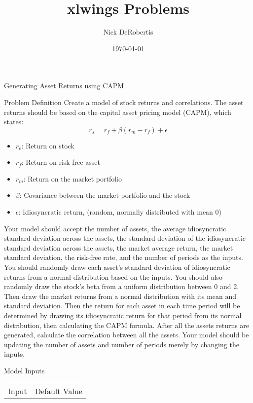 \documentclass[]{article}
\begin{document}
\title{xlwings Problems}
\author{Nick DeRobertis}
\date{\today}
\maketitle
\begin{section}{Generating Asset Returns using CAPM}
\begin{subsection}{Problem Definition}
Create a model of stock returns and correlations. The asset returns should be based on the capital asset pricing model (CAPM), which states:
\begin{equation}
	r_s = r_f + \beta (r_m - r_f) + \epsilon
\end{equation}
\begin{itemize}
\item $r_e$: Return on stock
\item $r_f$: Return on risk free asset
\item $r_m$: Return on the market portfolio
\item $\beta$: Covariance between the market portfolio and the stock
\item $\epsilon$: Idiosyncratic return, (random, normally distributed with mean 0)
\end{itemize}
Your model should accept the number of assets, the average idiosyncratic standard deviation across the assets, the standard deviation of the idiosyncratic standard deviation across the assets, the market average return, the market standard deviation, the risk-free rate, and the number of periods as the inputs. You should randomly draw each asset's standard deviation of idiosyncratic returns from a normal distribution based on the inputs. You should also randomly draw the stock's beta from a uniform distribution between 0 and 2. Then draw the market returns from a normal distribution with its mean and standard deviation. Then the return for each asset in each time period will be determined by drawing its idiosyncratic return for that period from its normal distribution, then calculating the CAPM formula. After all the assets returns are generated, calculate the correlation between all the assets. Your model should be updating the number of assets and number of periods merely by changing the inputs.
\end{subsection}
\begin{subsection}{Model Inputs}
\begin{center}
\begin{tabular}{l|c}
\toprule
Input & Default Value\\


\end{tabular}
\end{center}
\end{subsection}
\end{section}
\end{document}
